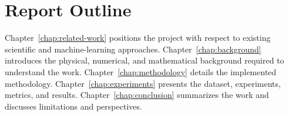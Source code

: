 \section{Report Outline}

Chapter~\ref{chap:related-work} positions the project with respect to existing scientific and machine-learning approaches. Chapter~\ref{chap:background} introduces the physical, numerical, and mathematical background required to understand the work. Chapter~\ref{chap:methodology} details the implemented methodology. Chapter~\ref{chap:experiments} presents the dataset, experiments, metrics, and results. Chapter~\ref{chap:conclusion} summarizes the work and discusses limitations and perspectives.
